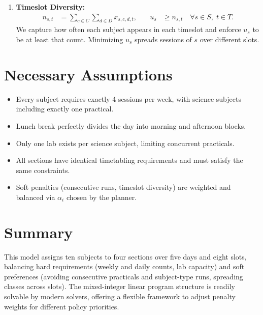 \documentclass[11pt]{article}
\begin{document}
\begin{enumerate}
  \item \textbf{Timeslot Diversity:}
  \begin{align*}
    n_{s,t} &= \sum_{c\in C}\sum_{d\in D} x_{s,c,d,t},
    &\quad u_s &\ge n_{s,t} \quad\forall s\in S,\;t\in T.
  \end{align*}
  We capture how often each subject appears in each timeslot and enforce $u_s$ to be at least that count. Minimizing $u_s$ spreads sessions of $s$ over different slots.

\end{enumerate}

\section{Necessary Assumptions}
\begin{itemize}
  \item Every subject requires exactly 4 sessions per week, with science subjects including exactly one practical.
  \item Lunch break perfectly divides the day into morning and afternoon blocks.
  \item Only one lab exists per science subject, limiting concurrent practicals.
  \item All sections have identical timetabling requirements and must satisfy the same constraints.
  \item Soft penalties (consecutive runs, timeslot diversity) are weighted and balanced via $\alpha_i$ chosen by the planner.
\end{itemize}

\section{Summary}
This model assigns ten subjects to four sections over five days and eight slots, balancing hard requirements (weekly and daily counts, lab capacity) and soft preferences (avoiding consecutive practicals and subject-type runs, spreading classes across slots). The mixed-integer linear program structure is readily solvable by modern solvers, offering a flexible framework to adjust penalty weights for different policy priorities.
\end{document}
